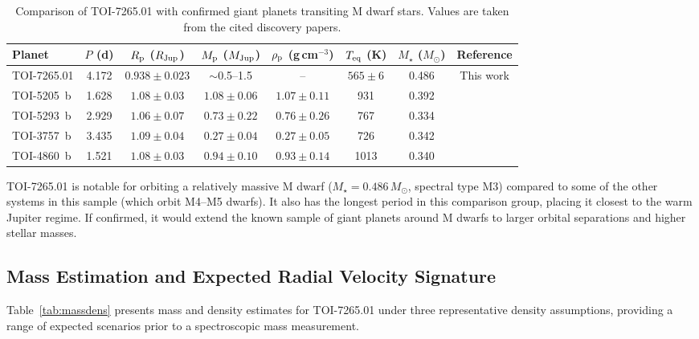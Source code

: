 \documentclass[fleqn,usenatbib]{mnras}
\newcommand{\Msun}{M_{\odot}}
\newcommand{\Mjup}{M_{\rm Jup}}
\newcommand{\Rjup}{R_{\rm Jup}}
\begin{document}
\begin{table}
  \caption{Comparison of TOI-7265.01 with confirmed giant planets transiting M dwarf stars. Values are taken from the cited discovery papers.}
  \label{tab:comparison}
  \begin{tabular}{lccccccc}
    \toprule
    Planet & $P$ (d) & $R_{\rm p}$ ($\Rjup$) & $M_{\rm p}$ ($\Mjup$) & $\rho_{\rm p}$ (g\,cm$^{-3}$) & $T_{\rm eq}$ (K) & $M_{\star}$ ($\Msun$) & Reference \\
    \midrule
    TOI-7265.01 & 4.172 & $0.938 \pm 0.023$ & $\sim$0.5--1.5 & -- & $565 \pm 6$ & 0.486 & This work \\
    TOI-5205~b & 1.628 & $1.08 \pm 0.03$ & $1.08 \pm 0.06$ & $1.07 \pm 0.11$ & 931 & 0.392 & \citet{kanodia2023} \\
    TOI-5293~b & 2.929 & $1.06 \pm 0.07$ & $0.73 \pm 0.22$ & $0.76 \pm 0.26$ & 767 & 0.334 & \citet{toi5293} \\
    TOI-3757~b & 3.435 & $1.09 \pm 0.04$ & $0.27 \pm 0.04$ & $0.27 \pm 0.05$ & 726 & 0.342 & \citet{toi3757} \\
    TOI-4860~b & 1.521 & $1.08 \pm 0.03$ & $0.94 \pm 0.10$ & $0.93 \pm 0.14$ & 1013 & 0.340 & \citet{toi4860} \\
    \bottomrule
  \end{tabular}
\end{table}

TOI-7265.01 is notable for orbiting a relatively massive M dwarf ($M_{\star} = 0.486\,\Msun$, spectral type M3) compared to some of the other systems in this sample (which orbit M4--M5 dwarfs). It also has the longest period in this comparison group, placing it closest to the warm Jupiter regime. If confirmed, it would extend the known sample of giant planets around M dwarfs to larger orbital separations and higher stellar masses.

\subsection{Mass Estimation and Expected Radial Velocity Signature}
\label{sec:mass}

Table~\ref{tab:massdens} presents mass and density estimates for TOI-7265.01 under three representative density assumptions, providing a range of expected scenarios prior to a spectroscopic mass measurement.
\end{document}
